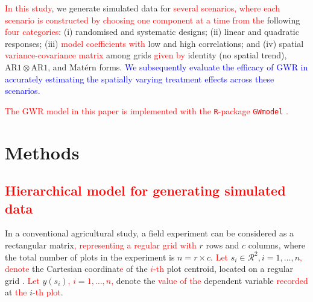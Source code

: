 \documentclass[a4paper]{article} 	%
\newcommand{\R}{\texttt{R}}
\newcommand{\Matern}{Mat\'ern }
\newcommand{\AR}{\mathrm{AR1}}
\newcommand{\revision}[1]{\textcolor{red}{#1}}
\newcommand{\zc}[1]{\textcolor{blue}{#1}}
\begin{document}
\revision{In this study}, we generate simulated data for \revision{several scenarios, where each scenario is constructed by choosing one component at a time from the} following \revision{four categories}: (i) randomised and systematic designs; (ii) linear and quadratic responses; (iii) \revision{model coefficients with} low and high correlations; and (iv) spatial \revision{variance-covariance matrix} among grids \revision{given by} identity (no spatial trend), $\AR\otimes\AR$, and \Matern forms. \zc{We subsequently evaluate the efficacy of GWR in accurately estimating the spatially varying treatment effects across these scenarios.}

\revision{The GWR model in this paper is implemented with the \R-package \texttt{GWmodel} \parencite{lu2014gwmodel, Gollini2015GWmodel}.}

\section{Methods}\label{Sec:Meth}




\subsection{\revision{Hierarchical model for generating simulated data}}\label{sec:basic}

In a conventional agricultural study, a field experiment can be considered as a rectangular matrix\revision{, representing a regular grid with} $r$ rows and $c$ columns, where the total number of plots in the experiment is $n=r\times c$. \revision{Let} $s_i\in \mathcal{R}^2, i=1,\ldots,n$\revision{,} \revision{denote} the Cartesian coordinat\revision{e} of the \revision{$i$-th} plot centroid, located on a regular grid \parencite{Zimmerman1991Randoma}. \revision{Let} $y(s_i)$\revision{, $i=1,\ldots,n$,} denote the \revision{value of the} dependent variable \revision{recorded} at \revision{the} $i$\revision{-th plot}. 
	
\end{document}
